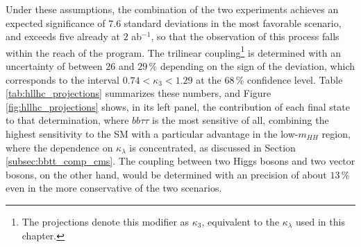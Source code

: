 Under these assumptions, the combination of the two experiments achieves an expected significance of $7.6$ standard deviations in the most favorable scenario, and exceeds five already at $2$ ab$^{-1}$, so that the observation of this process falls within the reach of the program. The trilinear coupling\footnote{The projections denote this modifier as $\kappa_3$, equivalent to the $\kappa_\lambda$ used in this chapter.} is determined with an uncertainty of between $26$ and $29\,\%$ depending on the sign of the deviation, which corresponds to the interval $0.74 < \kappa_3 < 1.29$ at the $68\,\%$ confidence level. Table \ref{tab:hllhc_projections} summarizes these numbers, and Figure \ref{fig:hllhc_projections} shows, in its left panel, the contribution of each final state to that determination, where $bb\tau\tau$ is the most sensitive of all, combining the highest sensitivity to the SM with a particular advantage in the low-$m_{HH}$ region, where the dependence on $\kappa_\lambda$ is concentrated, as discussed in Section \ref{subsec:bbtt_comp_cms}. The coupling between two Higgs bosons and two vector bosons, on the other hand, would be determined with an precision of about $13\,\%$ even in the more conservative of the two scenarios.

